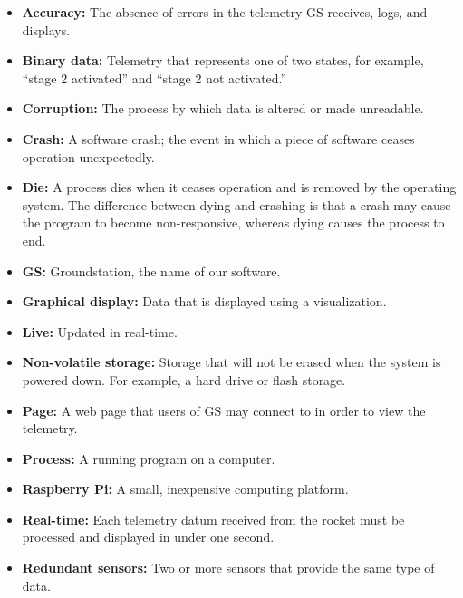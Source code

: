 \documentclass[10pt,draftclsnofoot,onecolumn]{IEEEtran}
\begin{document}
	\begin{itemize}
		\item \textbf{Accuracy:} The absence of errors in the telemetry GS receives, logs, and displays.
		\item \textbf{Binary data:} Telemetry that represents one of two states, for example, ``stage 2 activated'' and
		``stage 2 not activated.''
		\item \textbf{Corruption:} The process by which data is altered or made unreadable.
		\item \textbf{Crash:} A software crash; the event in which a piece of software ceases operation unexpectedly.
		\item \textbf{Die:} A process dies when it ceases operation and is removed by the operating system.
		The difference between dying and crashing is that a crash may cause the program to become non-responsive,
		whereas dying causes the process to end.
		\item \textbf{GS:} Groundstation, the name of our software.
		\item \textbf{Graphical display:} Data that is displayed using a visualization.
		\item \textbf{Live:} Updated in real-time.
		\item \textbf{Non-volatile storage:} Storage that will not be erased when the system is powered down.
		For example, a hard drive or flash storage.
		\item \textbf{Page:} A web page that users of GS may connect to in order to view the telemetry.
		\item \textbf{Process:} A running program on a computer.
		\item \textbf{Raspberry Pi:} A small, inexpensive computing platform.
		\item \textbf{Real-time:} Each telemetry datum received from the rocket must be processed and
		displayed in under one second.
		\item \textbf{Redundant sensors:} Two or more sensors that provide the same type of data.

\end{itemize}
\end{document}
